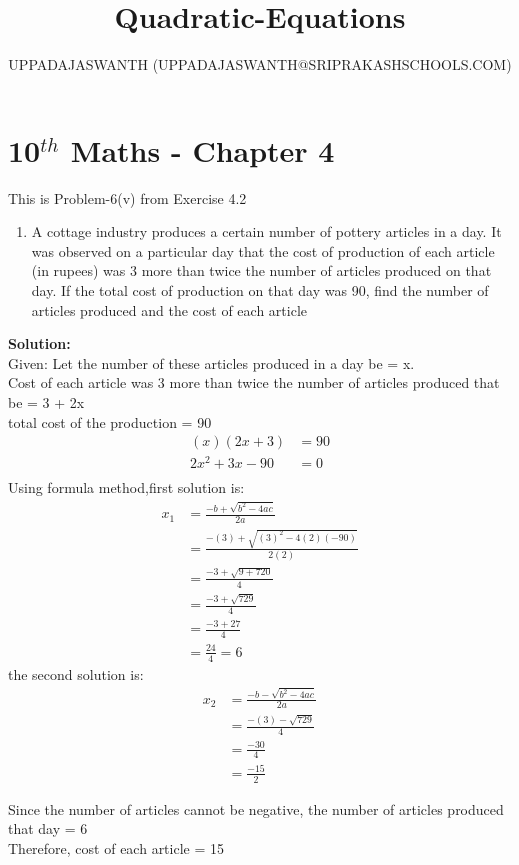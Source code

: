 \documentclass[12pt]{article}
\title{Quadratic-Equations}
\author{UPPADAJASWANTH (UPPADAJASWANTH@SRIPRAKASHSCHOOLS.COM)}
\newcommand{\solution}{\noindent \textbf{Solution: }}
\begin{document}
\maketitle
\section*{10$^{th}$ Maths - Chapter 4}
This is Problem-6(v) from Exercise 4.2\\
\begin{enumerate}
\item A cottage industry produces a certain number of pottery articles in a day. It was observed
on a particular day that the cost of production of each article (in rupees) was 3 more than
twice the number of articles produced on that day. If the total cost of production on that
day was 90, find the number of articles produced and the cost of each article\\
\end{enumerate}
\solution \\
Given:
Let the number of these articles produced in a day be = x.\\
Cost of each article was 3 more than twice the number of articles
produced that be = 3 + 2x\\
total cost of the production = 90\\
\begin{align}
(x)(2x + 3) &= 90\\
2x^2+3x-90&=0\\
\end{align}
Using formula method,first solution is:\\
\begin{align}
x_1 &= \frac{-b+\sqrt{b^2-4ac}}{2a}\\
&= \frac{-(3)+\sqrt{(3)^2-4(2)(-90)}}{2(2)}\\
&= \frac{-3+\sqrt{9+720}}{4}\\
&= \frac{-3+\sqrt{729}}{4}\\
&= \frac{-3+27}{4}\\
&= \frac{24}{4}=6
\end{align}
the second solution is:\\
\begin{align}
x_2 &= \frac{-b-\sqrt{b^2-4ac}}{2a}\\
&= \frac{-(3)-\sqrt{729}}{4}\\
&= \frac{-30}{4}\\
&= \frac{-15}{2}
\end{align}

Since the number of articles cannot be negative, the number of articles produced that day = 6\\
Therefore, cost of each article = 15\\
\end{document}
